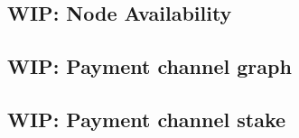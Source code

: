\subsection{WIP: Node Availability}
\label{sec:path-selection:node-availability}



\subsection{WIP: Payment channel graph}



\subsection{WIP: Payment channel stake}

